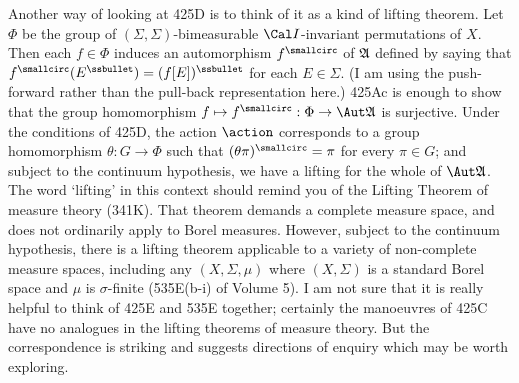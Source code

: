 {Another way of looking at 425D is to think of it as a kind of
lifting theorem.   Let $\Phi$ be the group of 
$(\Sigma,\Sigma)$-bimeasurable
$\Cal I$-invariant permutations of $X$.   Then each $f\in\Phi$ induces an
automorphism $f^{\smallcirc}$ of $\frak A$ defined by saying that
$f^{\smallcirc}(E^{\ssbullet})=(f[E])^{\ssbullet}$ for each $E\in\Sigma$.
(I am using the push-forward rather than the pull-back representation
here.)   425Ac is enough to show that
the group homomorphism
$f\mapsto f^{\smallcirc}:\Phi\to\Aut\frak A$ is surjective.   Under the
conditions of 425D, the action $\action$ corresponds to a group
homomorphism $\theta:G\to\Phi$ such that $(\theta\pi)^{\smallcirc}=\pi$ for
every $\pi\in G$;  and subject to the continuum hypothesis, we have a
lifting for the whole of $\Aut\frak A$.   The word `lifting' in this
context should remind you of the Lifting Theorem of measure theory (341K).
That theorem demands a complete measure space, and does not
ordinarily apply to Borel measures.   However, subject to the continuum
hypothesis, there is a lifting theorem applicable to a variety of
non-complete measure spaces, including any $(X,\Sigma,\mu)$
where $(X,\Sigma)$ is a standard Borel space and $\mu$ is $\sigma$-finite
(535E(b-i) of Volume 5).   I am not sure that it is really helpful to think
of 425E and 535E together;  certainly the manoeuvres of 425C have no
analogues in the lifting theorems of measure theory.   But the
correspondence is striking and suggests directions of enquiry which may be
worth exploring.
}

\discrpage

